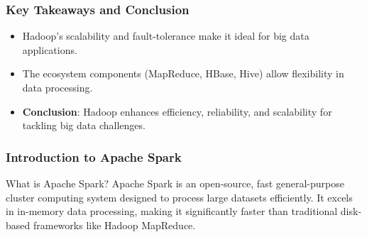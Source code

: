 \documentclass[aspectratio=169]{beamer}
\begin{document}
\begin{frame}
    \frametitle{Key Takeaways and Conclusion}
    \begin{itemize}
        \item Hadoop's scalability and fault-tolerance make it ideal for big data applications.
        \item The ecosystem components (MapReduce, HBase, Hive) allow flexibility in data processing.
        \item \textbf{Conclusion}: Hadoop enhances efficiency, reliability, and scalability for tackling big data challenges.
    \end{itemize}
\end{frame}

\begin{frame}[fragile]
    \frametitle{Introduction to Apache Spark}
    \begin{block}{What is Apache Spark?}
        Apache Spark is an open-source, fast general-purpose cluster computing system designed to process large datasets efficiently. It excels in in-memory data processing, making it significantly faster than traditional disk-based frameworks like Hadoop MapReduce.
    \end{block}
\end{frame}
\end{document}
